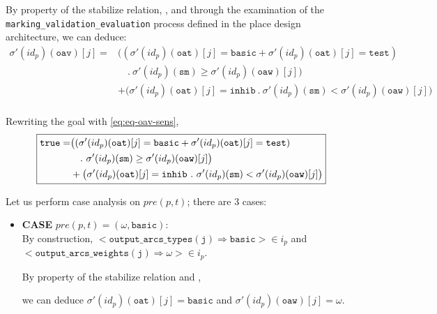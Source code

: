 \documentclass[dvipsnames,12pt]{article}
\begin{document}
\begin{niproof}
\begin{enumerate}
\begin{itemize}
      By property of the stabilize relation, \InCsCompP, and through
      the examination of the \texttt{marking_validation_evaluation}
      process defined in the place design architecture, we can deduce:
      \begin{equation}
        \label{eq:eq-oav-sens}
        \begin{split}
          \sigma'(id_p)(\texttt{oav})[j]=& \big((\sigma'(id_p)(\texttt{oat})[j]=\mathtt{basic}+\sigma'(id_p)(\texttt{oat})[j]=\mathtt{test}) \\
          & \quad.~\sigma'(id_p)(\texttt{sm})\ge\sigma'(id_p)(\texttt{oaw})[j]\big)\\
          & +\big(\sigma'(id_p)(\texttt{oat})[j]=\mathtt{inhib}~.~\sigma'(id_p)(\texttt{sm})<\sigma'(id_p)(\texttt{oaw})[j]\big)\\
        \end{split}
      \end{equation}

      Rewriting the goal with \eqref{eq:eq-oav-sens},
      \begin{equation*}
        \fbox{$
          \begin{split}
            \mathtt{true}=& \big((\sigma'(id_p)(\texttt{oat})[j]=\mathtt{basic}+\sigma'(id_p)(\texttt{oat})[j]=\mathtt{test}) \\
            & \quad.~\sigma'(id_p)(\texttt{sm})\ge\sigma'(id_p)(\texttt{oaw})[j]\big)\\
            & +\big(\sigma'(id_p)(\texttt{oat})[j]=\mathtt{inhib}~.~\sigma'(id_p)(\texttt{sm})<\sigma'(id_p)(\texttt{oaw})[j]\big)\\
          \end{split}
          $}
      \end{equation*}

      Let us perform case analysis on $pre(p,t)$; there are 3 cases:
      \begin{itemize}
      \item \textbf{CASE} $pre(p,t)=(\omega,\mathtt{basic})$:\\

        \noindent{}By construction,
        ${<}\mathtt{output\_arcs\_types(j)\Rightarrow{}basic}{>}\in{}i_p$
        and\\
        ${<}\mathtt{output\_arcs\_weights(j)\Rightarrow{}}\omega{>}\in{}i_p$.

        By property of the stabilize relation and \InCsCompP,

        we can deduce $\sigma'(id_p)(\texttt{oat})[j]=\mathtt{basic}$ and
        $\sigma'(id_p)(\texttt{oaw})[j]=\omega$.


\end{itemize}
\end{itemize}
\end{enumerate}
\end{niproof}
\end{document}
